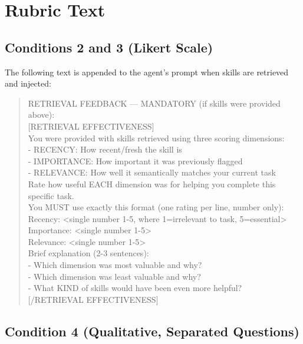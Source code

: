 
\section{Rubric Text}
\label{app:rubric}

\subsection{Conditions 2 and 3 (Likert Scale)}

The following text is appended to the agent's prompt when skills are retrieved and injected:

\begin{quote}
\small\ttfamily\raggedright\noindent
RETRIEVAL FEEDBACK --- MANDATORY (if skills were provided above):\\{}
[RETRIEVAL EFFECTIVENESS]\\{}
You were provided with skills retrieved using three scoring dimensions:\\{}
- RECENCY: How recent/fresh the skill is\\{}
- IMPORTANCE: How important it was previously flagged\\{}
- RELEVANCE: How well it semantically matches your current task\\[\medskipamount]
Rate how useful EACH dimension was for helping you complete this specific task.\\{}
You MUST use exactly this format (one rating per line, number only):\\[\medskipamount]
Recency: <single number 1-5, where 1=irrelevant to task, 5=essential>\\{}
Importance: <single number 1-5>\\{}
Relevance: <single number 1-5>\\[\medskipamount]
Brief explanation (2-3 sentences):\\{}
- Which dimension was most valuable and why?\\{}
- Which dimension was least valuable and why?\\{}
- What KIND of skills would have been even more helpful?\\{}
[/RETRIEVAL EFFECTIVENESS]
\end{quote}

\subsection{Condition 4 (Qualitative, Separated Questions)}

